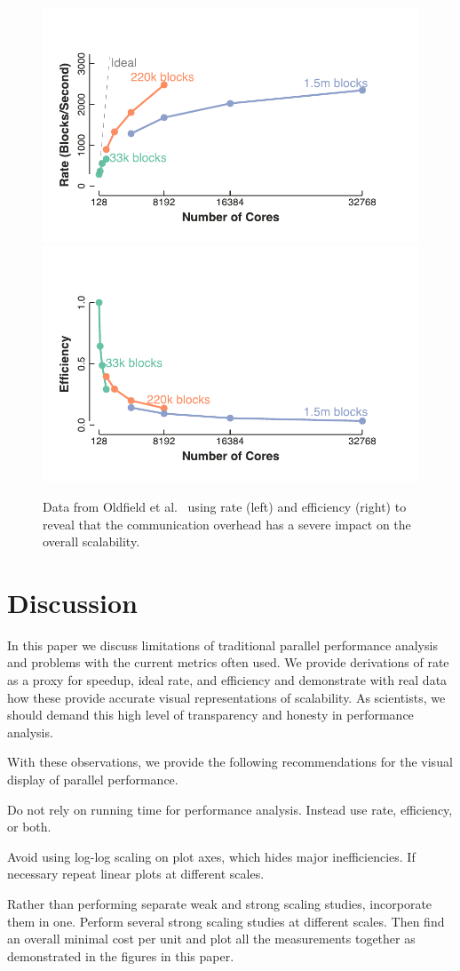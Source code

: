 \documentclass{llncs}
\newcommand*{\scite}[1]{~\cite{#1}}
\newcommand{\etal}{et al.\xspace}
\newenvironment{packed_itemize}{
  \begin{itemize}[noitemsep]
}{
  \end{itemize}
}
\begin{document}
\begin{figure}
  \centering
  \includegraphics[width=.48\linewidth]{images/OldfieldRate}\quad
  \includegraphics[width=.48\linewidth]{images/OldfieldEfficiency}
  \caption{Data from Oldfield \etal\scite{Oldfield2014} using
    rate (left) and efficiency (right) to reveal that the communication
    overhead has a severe impact on the overall scalability.}
  \label{fig:OldfieldBetter}
\end{figure}

\section{Discussion}

\noindent
In this paper we discuss limitations of traditional parallel performance
analysis and problems with the current metrics often used. We provide
derivations of rate as a proxy for speedup, ideal rate, and efficiency and
demonstrate with real data how these provide accurate visual
representations of scalability. As scientists, we should demand this high
level of transparency and honesty in performance analysis.

With these observations, we provide the following recommendations for the
visual display of parallel performance.
\begin{packed_itemize}
\item Do not rely on running time for performance analysis. Instead use
  rate, efficiency, or both.
\item Avoid using log-log scaling on plot axes, which hides major
  inefficiencies. If necessary repeat linear plots at different scales.
\item Rather than performing separate weak and strong scaling studies,
  incorporate them in one. Perform several strong scaling studies at
  different scales. Then find an overall minimal cost per unit and plot all
  the measurements together as demonstrated in the figures in this paper.
\end{packed_itemize}
\end{document}
